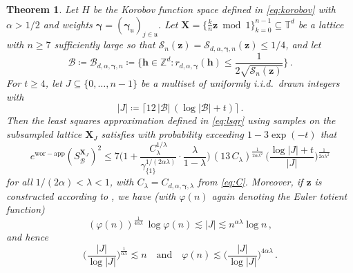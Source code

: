 \documentclass[a4paper]{amsart}
\newcommand{\bsz}{{\bm{z}}}
\newcommand{\bsgamma}{{\bm{\gamma}}}
\newcommand{\setu}{{\mathfrak{u}}}
\newtheorem{theorem}{Theorem}[section]
\newcommand{\ewc}{e^{\mathrm{wor-app}}}
\newcommand{\modone}{\bmod{}1}
\begin{document}
\begin{theorem}\label{koroboverror} Let $H$ be the Korobov function space defined in \eqref{eq:korobov} with $\alpha>1/2$ and weights $\bsgamma = (\bsgamma_\setu)_{j\in\setu}$.
    Let $\bm X = \{\frac kn\bm z\modone\}_{k=0}^{n-1} \subseteq\mathds T^d$ be a lattice with $n\ge 7$
    sufficiently large so that $\mathcal S_n(\bsz) = \mathcal S_{d,\alpha,\bsgamma,n}(\bsz)\le 1/4$, and let
    \begin{equation*}
        \mathcal B \coloneqq \mathcal B_{d,\alpha,\bsgamma,n}
        \coloneqq \Big\{ \bm h\in\mathds Z^d : r_{d,\alpha,\bm\gamma}(\bm h) \le
        \frac{1}{2\sqrt{\mathcal S_n(\bm z)}}
        \Big\} \,.
    \end{equation*}
    For $t\ge 4$, let $J\subseteq\{0, \dots, n-1\}$ be a multiset of uniformly i.i.d.\ drawn integers with
    \begin{equation*}
        |J|
        \coloneqq \lceil 12\,|\mathcal B|\,(\log|\mathcal B| + t) \rceil \,.
    \end{equation*}
    Then the least squares approximation defined in \eqref{eq:lsqr} using samples on the subsampled lattice $\bm X_J$ satisfies with probability exceeding $1-3\exp(-t)$ that
    \begin{equation} \label{eq:finalE}
        \ewc(S_{\mathcal B}^{\bm X_J})^2
        \le 7\Big(1+
        \frac{ C_\lambda^{1/\lambda} }{ \gamma_{\{1\}}^{1/(2\alpha\lambda)} }
        \cdot
        \frac{\lambda }{1-\lambda}
        \Big)\,(13\,C_\lambda)^{\frac{1}{2\alpha\lambda^2}}\,
        \Big(\frac{\log|J|+t}{|J|}\Big)^{\frac{1}{2\alpha\lambda^2}} 
    \end{equation}
    for all $1/(2\alpha) < \lambda < 1$, with $C_\lambda=C_{d,\alpha,\bm\gamma,\lambda}$ from \eqref{eq:C}.
    Moreover, if $\bm z$ is constructed according to \cite[Algorithm~3.2]{KMN24}, we have (with $\varphi(n)$ again denoting the Euler totient function)
    \begin{equation} \label{eq:finalJ}
        (\varphi(n))^{\frac{1}{4\alpha\lambda}}\,\log\varphi(n)
        \lesssim |J|
        \lesssim n^{\alpha\lambda} \log n \,,
    \end{equation}
    and hence
    \begin{equation} \label{eq:finalN}
        \Big(\frac{|J|}{\log|J|}\Big)^{\frac{1}{\alpha\lambda}}
        \lesssim n \quad\mbox{and}\quad
        \varphi(n)
        \lesssim \Big(\frac{|J|}{\log|J|}\Big)^{4\alpha\lambda} \,.
    \end{equation}
\end{theorem} 
\end{document}
